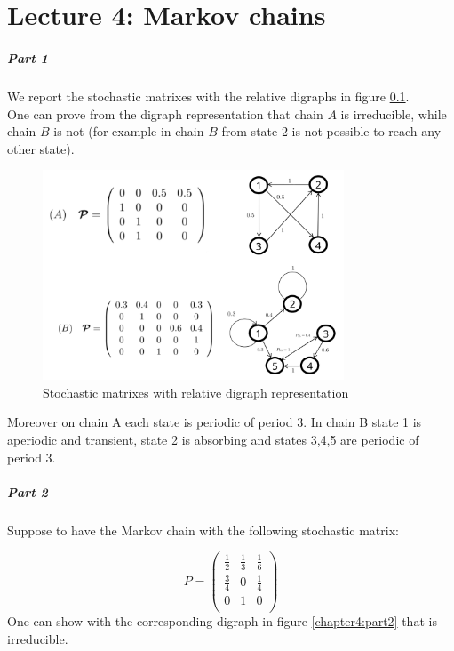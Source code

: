 \chapter*{Lecture 4: Markov chains}

\paragraph{Part 1} We report the stochastic matrixes with the relative digraphs in figure \ref{chapter4:part1}. \\
One can prove from the digraph representation that chain $A$ is irreducible, while chain $B$ is not (for example in chain $B$ from state 2 
is not possible to reach any other state).

\begin{figure}[H]
    \centering
    \includegraphics[width=0.8\textwidth]{FIG/exercise_4_images/Exercise 4_part1.png}
    \caption{Stochastic matrixes with relative digraph representation}
    \label{chapter4:part1}
\end{figure}

Moreover on chain A each state is periodic of period 3. In chain B state 1 is aperiodic and transient, state 2 is absorbing and states 3,4,5 are periodic of period 3.

\paragraph*{Part 2}

Suppose to have the Markov chain with the following stochastic matrix:

$$ P =
\begin{pmatrix} 
\frac{1}{2} & \frac{1}{3} & \frac{1}{6} \\
\frac{3}{4} & 0 & \frac{1}{4} \\
0 & 1 & 0 \\
\end{pmatrix}
$$
One can show with the corresponding digraph in figure \ref{chapter4:part2} that is irreducible. \\


